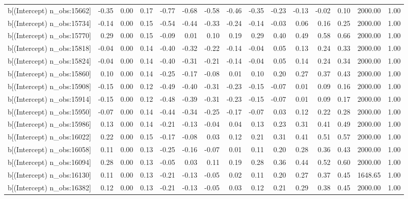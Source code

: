 \begin{table}[ht]
\begin{tabular}{rrrrrrrrrrrrrrr}
  b[(Intercept) n\_obs:15662] & -0.35 & 0.00 & 0.17 & -0.77 & -0.68 & -0.58 & -0.46 & -0.35 & -0.23 & -0.13 & -0.02 & 0.10 & 2000.00 & 1.00 \\ 
  b[(Intercept) n\_obs:15734] & -0.14 & 0.00 & 0.15 & -0.54 & -0.44 & -0.33 & -0.24 & -0.14 & -0.03 & 0.06 & 0.16 & 0.25 & 2000.00 & 1.00 \\ 
  b[(Intercept) n\_obs:15770] & 0.29 & 0.00 & 0.15 & -0.09 & 0.01 & 0.10 & 0.19 & 0.29 & 0.40 & 0.49 & 0.58 & 0.66 & 2000.00 & 1.00 \\ 
  b[(Intercept) n\_obs:15818] & -0.04 & 0.00 & 0.14 & -0.40 & -0.32 & -0.22 & -0.14 & -0.04 & 0.05 & 0.13 & 0.24 & 0.33 & 2000.00 & 1.00 \\ 
  b[(Intercept) n\_obs:15824] & -0.04 & 0.00 & 0.14 & -0.40 & -0.31 & -0.21 & -0.14 & -0.04 & 0.05 & 0.14 & 0.24 & 0.34 & 2000.00 & 1.00 \\ 
  b[(Intercept) n\_obs:15860] & 0.10 & 0.00 & 0.14 & -0.25 & -0.17 & -0.08 & 0.01 & 0.10 & 0.20 & 0.27 & 0.37 & 0.43 & 2000.00 & 1.00 \\ 
  b[(Intercept) n\_obs:15908] & -0.15 & 0.00 & 0.12 & -0.49 & -0.40 & -0.31 & -0.23 & -0.15 & -0.07 & 0.01 & 0.09 & 0.16 & 2000.00 & 1.00 \\ 
  b[(Intercept) n\_obs:15914] & -0.15 & 0.00 & 0.12 & -0.48 & -0.39 & -0.31 & -0.23 & -0.15 & -0.07 & 0.01 & 0.09 & 0.17 & 2000.00 & 1.00 \\ 
  b[(Intercept) n\_obs:15950] & -0.07 & 0.00 & 0.14 & -0.44 & -0.34 & -0.25 & -0.17 & -0.07 & 0.03 & 0.12 & 0.22 & 0.28 & 2000.00 & 1.00 \\ 
  b[(Intercept) n\_obs:15986] & 0.13 & 0.00 & 0.14 & -0.21 & -0.13 & -0.04 & 0.04 & 0.13 & 0.23 & 0.31 & 0.41 & 0.49 & 2000.00 & 1.00 \\ 
  b[(Intercept) n\_obs:16022] & 0.22 & 0.00 & 0.15 & -0.17 & -0.08 & 0.03 & 0.12 & 0.21 & 0.31 & 0.41 & 0.51 & 0.57 & 2000.00 & 1.00 \\ 
  b[(Intercept) n\_obs:16058] & 0.11 & 0.00 & 0.13 & -0.25 & -0.16 & -0.07 & 0.01 & 0.11 & 0.20 & 0.28 & 0.36 & 0.43 & 2000.00 & 1.00 \\ 
  b[(Intercept) n\_obs:16094] & 0.28 & 0.00 & 0.13 & -0.05 & 0.03 & 0.11 & 0.19 & 0.28 & 0.36 & 0.44 & 0.52 & 0.60 & 2000.00 & 1.00 \\ 
  b[(Intercept) n\_obs:16130] & 0.11 & 0.00 & 0.13 & -0.21 & -0.13 & -0.05 & 0.02 & 0.11 & 0.20 & 0.27 & 0.37 & 0.45 & 1648.65 & 1.00 \\ 
  b[(Intercept) n\_obs:16382] & 0.12 & 0.00 & 0.13 & -0.21 & -0.13 & -0.05 & 0.03 & 0.12 & 0.21 & 0.29 & 0.38 & 0.45 & 2000.00 & 1.00 \\ 

\end{tabular}
\end{table}
